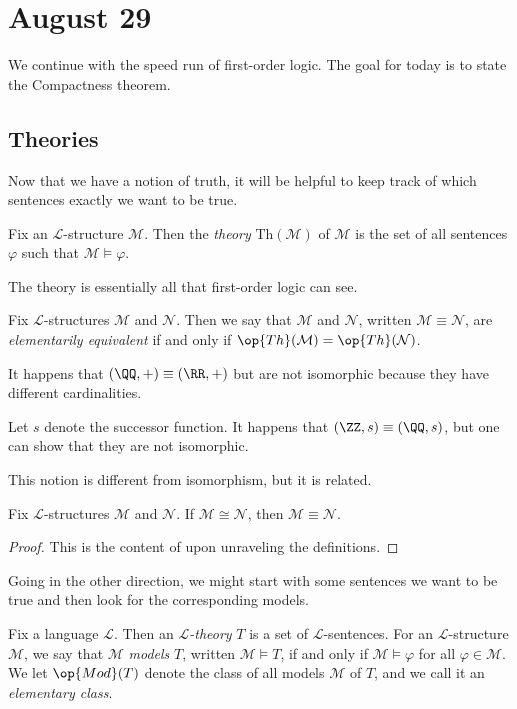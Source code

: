 \documentclass[../notes.tex]{subfiles}
\begin{document}
\section{August 29}

We continue with the speed run of first-order logic. The goal for today is to state the Compactness theorem.

\subsection{Theories}
Now that we have a notion of truth, it will be helpful to keep track of which sentences exactly we want to be true.
\begin{definition}[theory]
	Fix an $\mathcal L$-structure $\mathcal M$. Then the \textit{theory} $\mathrm{Th}(\mathcal M)$ of $\mathcal M$ is the set of all sentences $\varphi$ such that $\mathcal M\models\varphi$.
\end{definition}
The theory is essentially all that first-order logic can see.
\begin{definition}
	Fix $\mathcal L$-structures $\mathcal M$ and $\mathcal N$. Then we say that $\mathcal M$ and $\mathcal N$, written $\mathcal M\equiv\mathcal N$, are \textit{elementarily equivalent} if and only if $\op{Th}(\mathcal M)=\op{Th}(\mathcal N)$.
\end{definition}
\begin{example}
	It happens that $(\QQ,+)\equiv(\RR,+)$ but are not isomorphic because they have different cardinalities.
\end{example}
\begin{example}
	Let $s$ denote the successor function. It happens that $(\ZZ,s)\equiv(\QQ,s)$, but one can show that they are not isomorphic.
\end{example}
This notion is different from isomorphism, but it is related.
\begin{lemma}
	Fix $\mathcal L$-structures $\mathcal M$ and $\mathcal N$. If $\mathcal M\cong\mathcal N$, then $\mathcal M\equiv\mathcal N$.
\end{lemma}
\begin{proof}
	This is the content of  upon unraveling the definitions.
\end{proof}
Going in the other direction, we might start with some sentences we want to be true and then look for the corresponding models.
\begin{definition}[theory]
	Fix a language $\mathcal L$. Then an \textit{$\mathcal L$-theory} $T$ is a set of $\mathcal L$-sentences. For an $\mathcal L$-structure $\mathcal M$, we say that $\mathcal M$ \textit{models} $T$, written $\mathcal M\models T$, if and only if $\mathcal M\models\varphi$ for all $\varphi\in\mathcal M$. We let $\op{Mod}(T)$ denote the class of all models $\mathcal M$ of $T$, and we call it an \textit{elementary class}.
\end{definition}
\end{document}
